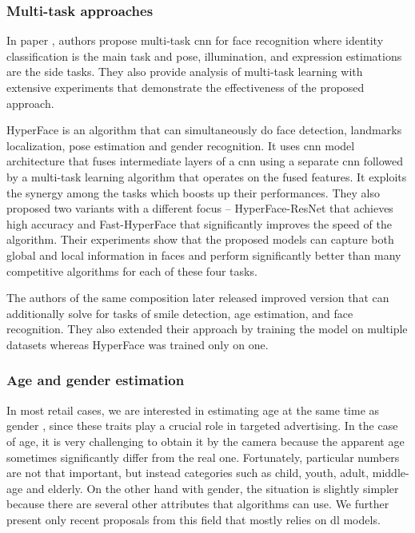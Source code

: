         \subsubsection{Multi-task approaches}
            In paper \cite{yin2018multi}, authors propose multi-task \gls{cnn} for face recognition where identity classification is the main task and pose, illumination, and expression estimations are the side tasks. They also provide analysis of multi-task learning with extensive experiments that demonstrate the effectiveness of the proposed approach.
            
            HyperFace \cite{ranjan2019hyperface} is an algorithm that can simultaneously do face detection, landmarks localization, pose estimation and gender recognition. It uses \gls{cnn} model architecture that fuses intermediate layers of a \gls{cnn} using a separate \gls{cnn} followed by a multi-task learning algorithm that operates on the fused features. It exploits the synergy among the tasks which boosts up their performances. They also proposed two variants with a different focus -- HyperFace-ResNet that achieves high accuracy and Fast-HyperFace that significantly improves the speed of the algorithm. Their experiments show that the proposed models can capture both global and local information in faces and perform significantly better than many competitive algorithms for each of these four tasks.
            
            The authors of the same composition later released improved version \cite{ranjan2017all} that can additionally solve for tasks of smile detection, age estimation, and face recognition. They also extended their approach by training the model on multiple datasets whereas HyperFace was trained only on one. 

        \subsubsection{Age and gender estimation}\label{age_and_gender_estimation_related}
            In most retail cases, we are interested in estimating age at the same time as gender \cite{ranjan2017all, wang2015deeply}, since these traits play a crucial role in targeted advertising. In the case of age, it is very challenging to obtain it by the camera because the apparent age sometimes significantly differ from the real one. Fortunately, particular numbers are not that important, but instead categories such as child, youth, adult, middle-age and elderly. On the other hand with gender, the situation is slightly simpler because there are several other attributes that algorithms can use. We further present only recent proposals from this field that mostly relies on \gls{dl} models. 
            

